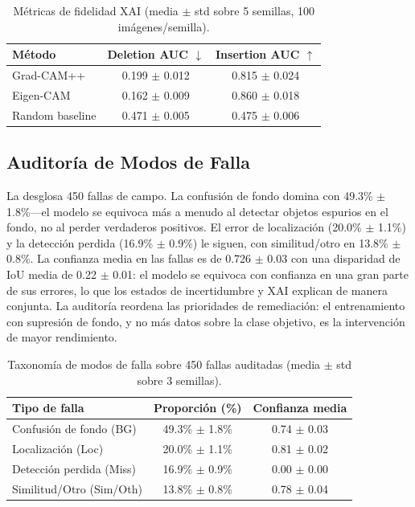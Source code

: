 \documentclass[10pt,twocolumn,letterpaper]{article}
\begin{document}
\begin{table}[htbp]
\centering
\caption{Métricas de fidelidad XAI (media $\pm$ std sobre 5 semillas, 100 imágenes/semilla).}
\label{tab:xai}
\begin{tabular}{@{}lcc@{}}
\toprule
\textbf{Método} & \textbf{Deletion AUC} $\downarrow$ & \textbf{Insertion AUC} $\uparrow$ \\
\midrule
Grad-CAM++ & 0.199 $\pm$ 0.012 & 0.815 $\pm$ 0.024 \\
Eigen-CAM & 0.162 $\pm$ 0.009 & 0.860 $\pm$ 0.018 \\
Random baseline & 0.471 $\pm$ 0.005 & 0.475 $\pm$ 0.006 \\
\bottomrule
\end{tabular}
\end{table}

\subsection{Auditoría de Modos de Falla}
La  desglosa 450 fallas de campo. La confusión de fondo domina con 49.3\% $\pm$ 1.8\%---el modelo se equivoca más a menudo al detectar objetos espurios en el fondo, no al perder verdaderos positivos. El error de localización (20.0\% $\pm$ 1.1\%) y la detección perdida (16.9\% $\pm$ 0.9\%) le siguen, con similitud/otro en 13.8\% $\pm$ 0.8\%. La confianza media en las fallas es de 0.726 $\pm$ 0.03 con una disparidad de IoU media de 0.22 $\pm$ 0.01: el modelo se equivoca con confianza en una gran parte de sus errores, lo que los estados de incertidumbre y XAI explican de manera conjunta. La auditoría reordena las prioridades de remediación: el entrenamiento con supresión de fondo, y no más datos sobre la clase objetivo, es la intervención de mayor rendimiento.

\begin{table}[htbp]
\centering
\caption{Taxonomía de modos de falla sobre 450 fallas auditadas (media $\pm$ std sobre 3 semillas).}
\label{tab:failure}
\begin{tabular}{@{}lcc@{}}
\toprule
\textbf{Tipo de falla} & \textbf{Proporción (\%)} & \textbf{Confianza media} \\
\midrule
Confusión de fondo (BG) & 49.3\% $\pm$ 1.8\% & 0.74 $\pm$ 0.03 \\
Localización (Loc) & 20.0\% $\pm$ 1.1\% & 0.81 $\pm$ 0.02 \\
Detección perdida (Miss) & 16.9\% $\pm$ 0.9\% & 0.00 $\pm$ 0.00 \\
Similitud/Otro (Sim/Oth) & 13.8\% $\pm$ 0.8\% & 0.78 $\pm$ 0.04 \\
\bottomrule
\end{tabular}
\end{table}
\end{document}
